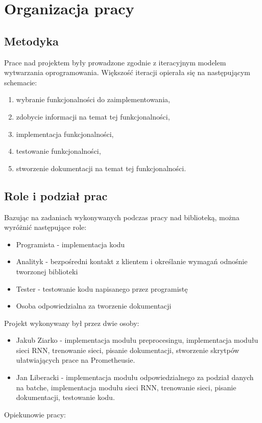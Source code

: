 \newpage
\section{Organizacja pracy}

\subsection{Metodyka}

Prace nad projektem były prowadzone zgodnie z iteracyjnym modelem wytwarzania oprogramowania. 
Większość iteracji opierała się na następującym schemacie: 
\begin{enumerate}
  \item wybranie funkcjonalności do zaimplementowania,
  \item zdobycie informacji na temat tej funkcjonalności,
  \item implementacja funkcjonalności,
  \item testowanie funkcjonalności,
  \item stworzenie dokumentacji na temat tej funkcjonalności.
\end{enumerate}

\subsection{Role i podział prac}
Bazując na zadaniach wykonywanych podczas pracy nad biblioteką, można wyróżnić następujące role:
\begin{itemize}
  \item Programista - implementacja kodu
  \item Analityk -  bezpośredni kontakt z klientem i określanie wymagań odnośnie tworzonej biblioteki
  \item Tester - testowanie kodu napisanego przez programistę
  \item Osoba odpowiedzialna za tworzenie dokumentacji
\end{itemize}
Projekt wykonywany był przez dwie osoby:
\begin{itemize}
  \item Jakub Ziarko - implementacja modułu preprocesingu, implementacja modułu sieci RNN, 
  trenowanie sieci, pisanie dokumentacji, stworzenie skrytpów ułatwiających prace na Prometheusie.
  \item Jan Liberacki - implementacja modułu odpowiedzialnego za podział danych na batche, 
  implementacja modułu sieci RNN, trenowanie sieci, pisanie dokumentacji, testowanie kodu.
\end{itemize}
Opiekunowie pracy:

